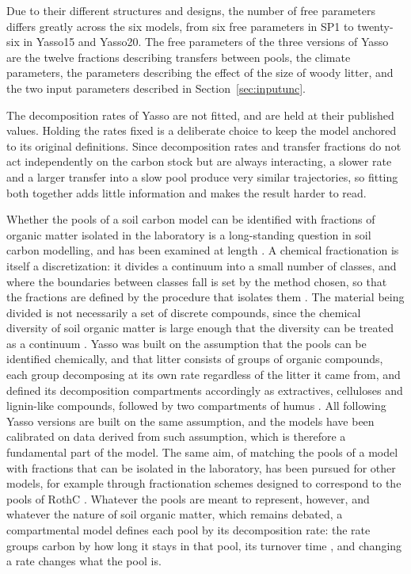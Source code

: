 \documentclass[11pt]{article}
\begin{document}
Due to their different structures and designs, the number of free parameters differs greatly
across the six models, from six free parameters in SP1 to twenty-six in Yasso15 and Yasso20.
The free parameters of the three versions of Yasso are the twelve fractions describing
transfers between pools, the climate parameters, the parameters describing the effect of the
size of woody litter, and the two input parameters described in
Section~\ref{sec:inputunc}.

The decomposition rates of Yasso are not fitted, and are held at their published values.
Holding the rates fixed is a deliberate choice to keep the model anchored to its original
definitions. Since decomposition rates and transfer fractions do not act independently on the
carbon stock but are always interacting, a slower rate and a larger transfer into a slow pool
produce very similar trajectories, so fitting both together adds little information and makes
the result harder to read.

Whether the pools of a soil carbon model can be identified with fractions of organic matter
isolated in the laboratory is a long-standing question in soil carbon modelling, and has been
examined at length \citep{vonLutzow2007}.
A chemical fractionation is itself a
discretization: it divides a continuum into a small number of classes, and where the boundaries between classes fall
is set by the method chosen, so that the fractions are defined by the procedure that isolates
them \citep{vonLutzow2007}. The material being divided is not necessarily a set of discrete compounds, since the chemical diversity of soil organic matter is large enough that the diversity can be treated as a continuum \citep{LehmannKleber2015}.
Yasso was built on the assumption that the pools can be identified chemically, and that litter consists of groups of organic compounds, each group decomposing at its own rate regardless of the litter it came from, and defined its
decomposition compartments accordingly as extractives, celluloses and lignin-like compounds,
followed by two compartments of humus \citep{Liski2005}. All following Yasso versions are built on the same assumption, and the models have been calibrated on data derived from such assumption, which is therefore a fundamental part of the model.  The same aim, of matching the pools of a model with fractions that can be isolated in the laboratory, has been pursued for other models, for example through fractionation schemes designed to correspond to the pools of RothC \citep{Zimmermann2007}.
Whatever the pools are meant to represent, however, and whatever the nature of soil organic
matter, which remains debated, a compartmental model defines each pool by its decomposition
rate: the rate groups carbon by how long it stays in that pool, its turnover time
\citep{Sierra2017}, and changing a rate changes what the pool is.
\end{document}
